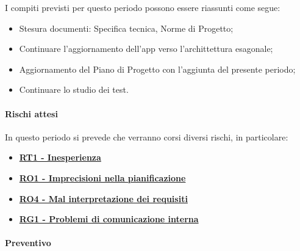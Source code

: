 I compiti previsti per questo periodo possono essere riassunti come segue:  
\begin{itemize}
    \item Stesura documenti: Specifica tecnica, Norme di Progetto;
    \item Continuare l'aggiornamento dell'app verso l'archittettura esagonale;
    \item Aggiornamento del Piano di Progetto con l’aggiunta del presente periodo;
    \item Continuare lo studio dei test.
    
\end{itemize}

\paragraph{Rischi attesi}  
In questo periodo si prevede che verranno corsi diversi rischi, in particolare:
\begin{itemize}
    \item \textbf{\hyperlink{RT1}{RT1 - Inesperienza}}
    \item \textbf{\hyperlink{RO1}{RO1 - Imprecisioni nella pianificazione}}
    \item \textbf{\hyperlink{RO4}{RO4 - Mal interpretazione dei requisiti}}
    \item \textbf{\hyperlink{RG1}{RG1 - Problemi di comunicazione interna}}
\end{itemize}

\paragraph{Preventivo} \hspace{1cm} 
\\ \hspace{1cm} \\

